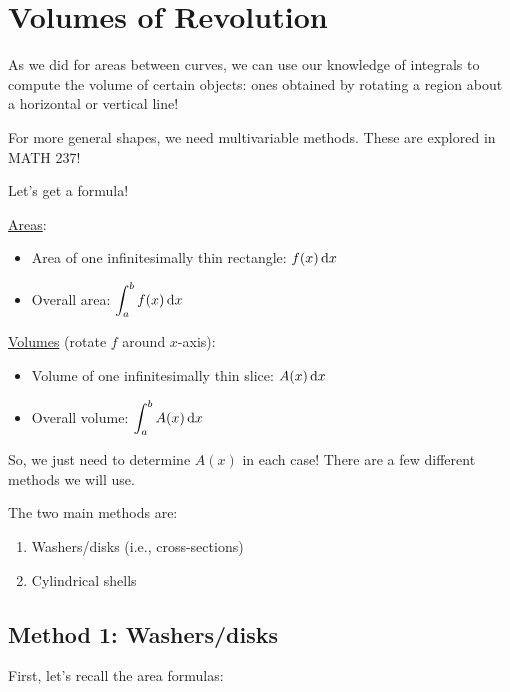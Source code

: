 \section{Volumes of Revolution}
As we did for areas between curves, we can use our knowledge of
integrals to compute the volume of certain objects: ones obtained
by rotating a region about a horizontal or vertical line!

\begin{Remark}{}{}
    For more general shapes, we need multivariable methods. These are
    explored in MATH 237!
\end{Remark}

Let's get a formula!

\underline{Areas}:
\begin{itemize}
    \item Area of one infinitesimally thin rectangle: $ f(x)\odif{x} $
    \item Overall area: $ \displaystyle \int_{a}^{b} f(x)\odif{x}  $
\end{itemize}
\underline{Volumes} (rotate $ f $ around $ x $-axis):
\begin{itemize}
    \item Volume of one infinitesimally thin slice: $ A(x)\odif{x} $
    \item Overall volume: $ \displaystyle \int_{a}^{b} A(x)\odif{x} $
\end{itemize}

So, we just need to determine $ A(x) $ in each case! There are
a few different methods we will use.

The two main methods are:
\begin{enumerate}[label=(\Roman*)]
    \item Washers/disks (i.e., cross-sections)
    \item Cylindrical shells
\end{enumerate}

\subsection*{Method 1: Washers/disks}

First, let's recall the area formulas:

